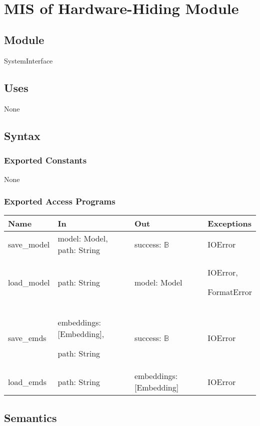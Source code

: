 \documentclass[12pt, titlepage]{article}
\begin{document}
\newpage
~\newpage

\section{MIS of Hardware-Hiding Module} \label{ModuleHH}

\subsection{Module}

SystemInterface

\subsection{Uses}
None

\subsection{Syntax}

\subsubsection{Exported Constants}
None
\subsubsection{Exported Access Programs}

\begin{center}
\begin{tabular}{p{2cm} p{4cm} p{4cm} p{2cm}}
\hline
\textbf{Name} & \textbf{In} & \textbf{Out} & \textbf{Exceptions} \\
\hline
save\_model & model: Model, path: String & success: $\mathbb{B}$ & IOError \\
\hline
load\_model & path: String & model: Model & IOError,

FormatError \\
\hline
save\_emds & embeddings: [Embedding],

path: String & success: $\mathbb{B}$ & IOError \\
\hline
load\_emds & path: String & embeddings: [Embedding] & IOError \\
\hline
\end{tabular}
\end{center}

\subsection{Semantics}
\end{document}

